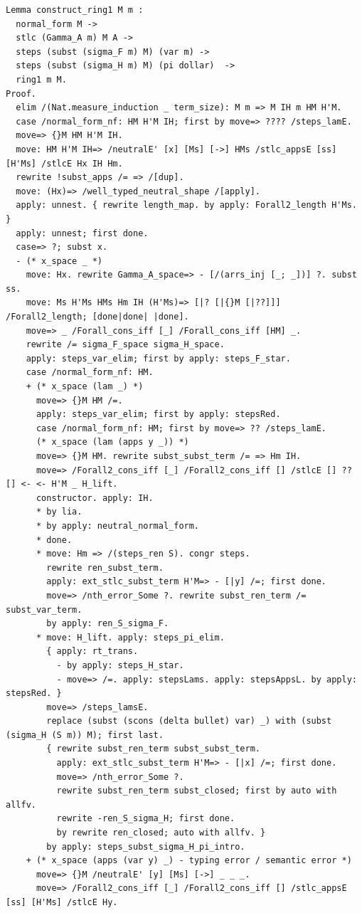 \begin{lstlisting}
Lemma construct_ring1 M m :
  normal_form M ->
  stlc (Gamma_A m) M A ->
  steps (subst (sigma_F m) M) (var m) ->
  steps (subst (sigma_H m) M) (pi dollar)  ->
  ring1 m M.
Proof.
  elim /(Nat.measure_induction _ term_size): M m => M IH m HM H'M.
  case /normal_form_nf: HM H'M IH; first by move=> ???? /steps_lamE.
  move=> {}M HM H'M IH.
  move: HM H'M IH=> /neutralE' [x] [Ms] [->] HMs /stlc_appsE [ss] [H'Ms] /stlcE Hx IH Hm.
  rewrite !subst_apps /= => /[dup].
  move: (Hx)=> /well_typed_neutral_shape /[apply].
  apply: unnest. { rewrite length_map. by apply: Forall2_length H'Ms. }
  apply: unnest; first done.
  case=> ?; subst x.
  - (* x_space _ *)
    move: Hx. rewrite Gamma_A_space=> - [/(arrs_inj [_; _])] ?. subst ss.
    move: Ms H'Ms HMs Hm IH (H'Ms)=> [|? [|{}M [|??]]] /Forall2_length; [done|done| |done].
    move=> _ /Forall_cons_iff [_] /Forall_cons_iff [HM] _.
    rewrite /= sigma_F_space sigma_H_space.
    apply: steps_var_elim; first by apply: steps_F_star.
    case /normal_form_nf: HM.
    + (* x_space (lam _) *)
      move=> {}M HM /=.
      apply: steps_var_elim; first by apply: stepsRed.
      case /normal_form_nf: HM; first by move=> ?? /steps_lamE.
      (* x_space (lam (apps y _)) *)
      move=> {}M HM. rewrite subst_subst_term /= => Hm IH.
      move=> /Forall2_cons_iff [_] /Forall2_cons_iff [] /stlcE [] ?? [] <- <- H'M _ H_lift.
      constructor. apply: IH.
      * by lia.
      * by apply: neutral_normal_form.
      * done.
      * move: Hm => /(steps_ren S). congr steps.
        rewrite ren_subst_term.
        apply: ext_stlc_subst_term H'M=> - [|y] /=; first done.
        move=> /nth_error_Some ?. rewrite subst_ren_term /= subst_var_term.
        by apply: ren_S_sigma_F.
      * move: H_lift. apply: steps_pi_elim.
        { apply: rt_trans.
          - by apply: steps_H_star.
          - move=> /=. apply: stepsLams. apply: stepsAppsL. by apply: stepsRed. }
        move=> /steps_lamsE.
        replace (subst (scons (delta bullet) var) _) with (subst (sigma_H (S m)) M); first last.
        { rewrite subst_ren_term subst_subst_term.
          apply: ext_stlc_subst_term H'M=> - [|x] /=; first done.
          move=> /nth_error_Some ?.
          rewrite subst_ren_term subst_closed; first by auto with allfv.
          rewrite -ren_S_sigma_H; first done.
          by rewrite ren_closed; auto with allfv. }
        by apply: steps_subst_sigma_H_pi_intro.
    + (* x_space (apps (var y) _) - typing error / semantic error *)
      move=> {}M /neutralE' [y] [Ms] [->] _ _ _.
      move=> /Forall2_cons_iff [_] /Forall2_cons_iff [] /stlc_appsE [ss] [H'Ms] /stlcE Hy.

\end{lstlisting}
